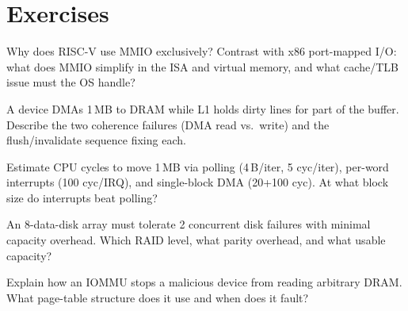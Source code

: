 \section{Exercises}
\begin{exercise}Why does RISC-V use MMIO exclusively? Contrast with x86 port-mapped I/O: what does MMIO simplify in the ISA and virtual memory, and what cache/TLB issue must the OS handle?\end{exercise}
\begin{exercise}A device DMAs 1\,MB to DRAM while L1 holds dirty lines for part of the buffer. Describe the two coherence failures (DMA read vs.\ write) and the flush/invalidate sequence fixing each.\end{exercise}
\begin{exercise}Estimate CPU cycles to move 1\,MB via polling (4\,B/iter, 5 cyc/iter), per-word interrupts (100 cyc/IRQ), and single-block DMA (20+100 cyc). At what block size do interrupts beat polling?\end{exercise}
\begin{exercise}An 8-data-disk array must tolerate 2 concurrent disk failures with minimal capacity overhead. Which RAID level, what parity overhead, and what usable capacity?\end{exercise}
\begin{exercise}Explain how an IOMMU stops a malicious device from reading arbitrary DRAM. What page-table structure does it use and when does it fault?\end{exercise}

